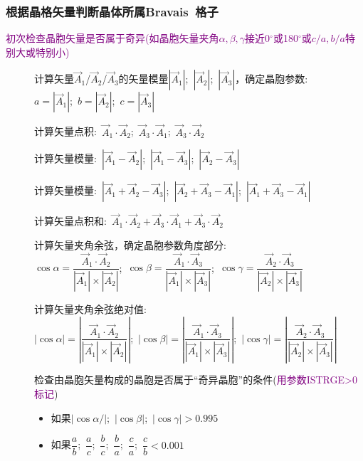 \documentclass{article}      %
\begin{document}
\subsubsection{根据晶格矢量判断晶体所属\rm{Bravais~}格子}\label{tag:Bravais-latt}
\noindent\textcolor{purple}{初次检查晶胞矢量是否属于奇异(如晶胞矢量夹角$\alpha,\beta,\gamma$接近0$^{\circ}$或180$^{\circ}$或$c/a,b/a$特别大或特别小)}
\begin{description}
	\item[]计算矢量$\vec A_1$/$\vec A_2$/$\vec A_3$的矢量模量$|\vec A_1|$;~$|\vec A_2|$;~$|\vec A_3|$，确定晶胞参数:\\
		$a=|\vec A_1|$;~$b=|\vec A_2|$;~$c=|\vec A_3|$
	\item[]计算矢量点积:~$\vec A_1\cdot\vec A_2$;~$\vec A_3\cdot\vec A_1$;~$\vec A_3\cdot\vec A_2$
	\item[]计算矢量模量:~$|\vec A_1-\vec A_2|$;~$|\vec A_1-\vec A_3|$;~$|\vec A_2-\vec A_3|$
	\item[]计算矢量模量:~$|\vec A_1+\vec A_2-\vec A_3|$;~$|\vec A_2+\vec A_3-\vec A_1|$;~$|\vec A_1+\vec A_3-\vec A_1|$
	\item[]计算矢量点积和:~$\vec A_1\cdot\vec A_2+\vec A_3\cdot\vec A_1+\vec A_3\cdot\vec A_2$
	\item[]计算矢量夹角余弦，确定晶胞参数角度部分:\\
		$\cos\alpha=\dfrac{\vec A_1\cdot\vec A_2}{|\vec A_1|\times|\vec A_2|}$;~$\cos\beta=\dfrac{\vec A_1\cdot\vec A_3}{|\vec A_1|\times|\vec A_3|}$;~$\cos\gamma=\dfrac{\vec A_2\cdot\vec A_3}{|\vec A_2|\times|\vec A_3|}$
	\item[]计算矢量夹角余弦绝对值:\\
		$|\cos\alpha|=\left|\dfrac{\vec A_1\cdot\vec A_2}{|\vec A_1|\times|\vec A_2|}\right|$;~$|\cos\beta|=\left|\dfrac{\vec A_1\cdot\vec A_3}{|\vec A_1|\times|\vec A_3|}\right|$;~$|\cos\gamma|=\left|\dfrac{\vec A_2\cdot\vec A_3}{|\vec A_2|\times|\vec A_3|}\right|$
	\item[]检查由晶胞矢量构成的晶胞是否属于“奇异晶胞”的条件(\textcolor{purple}{用参数\textrm{ISTRGE}>0标记})
\begin{itemize}
	\item[]如果$|\cos\alpha/|$;~$|\cos\beta|$;~$|\cos\gamma|>0.995$
	\item[]如果$\dfrac ab$;~$\dfrac ac$;~$\dfrac bc$;~$\dfrac ba$;~$\dfrac ca$;~$\dfrac cb<0.001$
\end{itemize}
\end{description}
\end{document}
